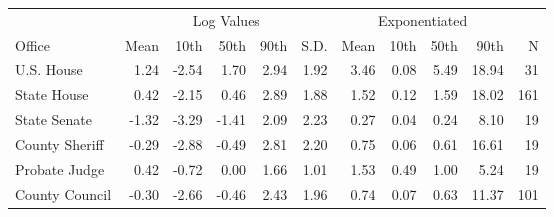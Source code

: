 
\begin{tabular}{lrrrrrrrrrr}
\toprule
\multicolumn{1}{c}{ } & \multicolumn{5}{c}{Log Values} & \multicolumn{4}{c}{Exponentiated} & \multicolumn{1}{c}{ } \\
\cmidrule(l{3pt}r{3pt}){2-6} \cmidrule(l{3pt}r{3pt}){7-10}
Office & Mean & 10th & 50th & 90th & S.D. & Mean & 10th & 50th & 90th & N\\
\midrule
U.S. House & 1.24 & -2.54 & 1.70 & 2.94 & 1.92 & 3.46 & 0.08 & 5.49 & 18.94 & 31\\
State House & 0.42 & -2.15 & 0.46 & 2.89 & 1.88 & 1.52 & 0.12 & 1.59 & 18.02 & 161\\
State Senate & -1.32 & -3.29 & -1.41 & 2.09 & 2.23 & 0.27 & 0.04 & 0.24 & 8.10 & 19\\
County Sheriff & -0.29 & -2.88 & -0.49 & 2.81 & 2.20 & 0.75 & 0.06 & 0.61 & 16.61 & 19\\
Probate Judge & 0.42 & -0.72 & 0.00 & 1.66 & 1.01 & 1.53 & 0.49 & 1.00 & 5.24 & 19\\
County Council & -0.30 & -2.66 & -0.46 & 2.43 & 1.96 & 0.74 & 0.07 & 0.63 & 11.37 & 101\\
\bottomrule
\end{tabular}
